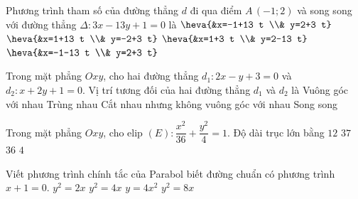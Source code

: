 \begin{ex}%
Phương trình tham số của đường thẳng $d$ đi qua điểm $A\,(-1; 2)$ và song song với đường thẳng $\Delta: 3 x-13 y+1=0$ là
\choice
{\True $\heva{&x=-1+13 t \\& y=2+3 t}$}
{$\heva{&x=1+13 t \\& y=-2+3 t}$}
{$\heva{&x=1+3 t \\& y=2-13 t}$}
{$\heva{&x=-1-13 t \\& y=2+3 t}$}
\end{ex}

\begin{ex}%
Trong mặt phẳng $Oxy$, cho hai đường thẳng $d_1\colon 2x-y+3=0$ và $d_2\colon x+2y+1=0$. Vị trí tương đối của hai đường thẳng $d_1$ và $d_2$ là
\choice
{\True Vuông góc với nhau}
{Trùng nhau}
{Cắt nhau nhưng không vuông góc với nhau}
{Song song}
\end{ex}

\begin{ex}%
Trong mặt phẳng ${Oxy}$, cho elip $ {(E)}:\dfrac{x^{2}}{36}+\dfrac{y^2}{4}=1$. Độ dài trục lớn bằng
\choice
{ \True ${12}$ }
{ ${37}$ }
{ ${36}$ }
{ ${4}$ }
\end{ex}

\begin{ex}%
Viết phương trình chính tắc của Parabol biết đường chuẩn có phương trình $x+1=0$.
\choice
{$y^2=2x$}
{\True $y^2=4x$}
{$y=4x^2$}
{$y^2=8x$}
\end{ex}

